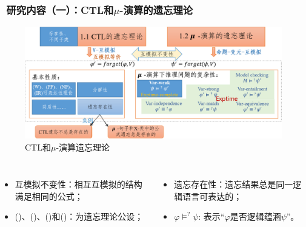 \documentclass[9pt, CJK]{beamer}
\begin{document}
\begin{frame}  
	\frametitle{~研究内容（一）：CTL和$\mu$-演算的遗忘理论}
	\begin{figure}
		\includegraphics[scale=0.35]{figures/ctlMuForgFrame}
		\caption{CTL和$\mu$-演算遗忘理论}
	\end{figure}
	{\tiny 
		\begin{columns}
			\begin{itemize} 
				\item 互模拟不变性：相互互模拟的结构满足相同的公式；
				\item (\W)、(\PP)、(\NgP)和(\IR)：为遗忘理论公设；
			\end{itemize}
			\begin{itemize}
				\item 遗忘存在性：遗忘结果总是同一逻辑语言可表达的；
				\item $\varphi \models^? \psi$: 表示“$\varphi$是否逻辑蕴涵$\psi$”。
			\end{itemize}
		\end{columns}
	} 
\end{frame}
\end{document}
